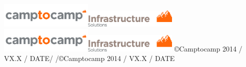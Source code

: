 \usepackage{lastpage}
\usepackage[headsepline,footsepline]{scrlayer-scrpage}


\newcommand{\ctoclogo}{\includegraphics[width=12em]{camptocamp.png}}
\newcommand{\ctocinfralogo}{\includegraphics[width=12em]{rapport_logo_haut_droite_infrastructure_rgb.png}}
\newcommand{\ctocinfraheader}{\ctoclogo\hfill{}\ctocinfralogo}

%
  {%
    {\ctocinfraheader}
    {\ctocinfraheader}
    {}
  }%
  {%
    {\color{c2c}\textrm\copyright Camptocamp 2014 / VX.X / DATE\hfill\pagemark/\pageref{LastPage}}
    {\color{c2c}\textrm\pagemark/\pageref{LastPage}\hfill{}\copyright Camptocamp 2014 / VX.X / DATE}
    {}
  } %

\pagestyle{c2c}
\renewcommand*{\chapterpagestyle}{c2c}
